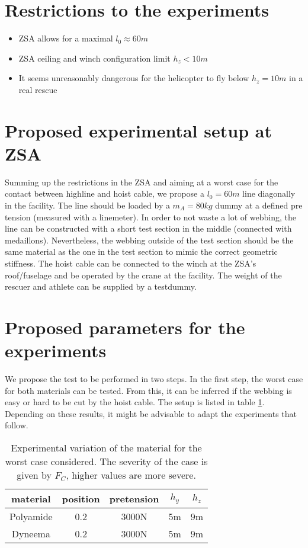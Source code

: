 \documentclass[a4paper,10pt]{scrartcl}
\begin{document}
\section{Restrictions to the experiments}
\begin{itemize}
\item ZSA allows for a maximal $l_0 \approx 60m$
\item ZSA ceiling and winch configuration limit $h_z < 10m$ 
\item It seems unreasonably dangerous for the helicopter to fly below $h_z=10m$ in a real rescue
\end{itemize}

\section{Proposed experimental setup at ZSA}

Summing up the restrictions in the ZSA and aiming at a worst case for the contact between highline and hoist cable, we propose a $l_0=60m$ line diagonally in the facility. The line should be loaded by a $m_A=80kg$ dummy at a defined pre tension (measured with a linemeter). In order to not waste a lot of webbing, the line can be constructed with a short test section in the middle (connected with medaillons). Nevertheless, the webbing outside of the test section should be the same material as the one in the test section to mimic the correct geometric stiffness. The hoist cable can be connected to the winch at the ZSA's roof/fuselage and be operated by the crane at the facility. The weight of the rescuer and athlete can be supplied by a testdummy. 

\section{Proposed parameters for the experiments}

We propose the test to be performed in two steps. In the first step, the worst case for both materials can be tested. From this, it can be inferred if the webbing is easy or hard to be cut by the hoist cable. The setup is listed in table \ref{tbl::worstCase}. Depending on these results, it might be advisable to adapt the experiments that follow.

\begin{table}[ht]
\centering
\begin{tabular}{ c | c | c | c | c }
 material & position & pretension & $h_y$ & $h_z$ \\
\hline
\hline
 Polyamide & 0.2 & 3000N & 5m & 9m \\
 Dyneema & 0.2 & 3000N & 5m & 9m 
\end{tabular}
\caption{Experimental variation of the material for the worst case considered. The severity of the case is given by $F_C$, higher values are more severe.}
\label{tbl::worstCase}
\end{table}
\end{document}
